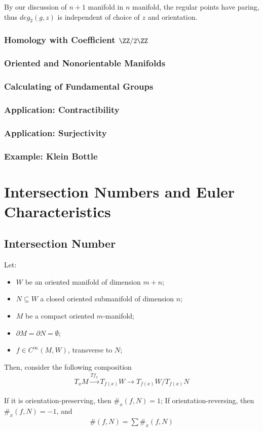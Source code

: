 \documentclass[Total.tex]{subfiles}
\begin{document}
				By our discussion of $n+1$ manifold in $n$ manifold, the regular points have paring, thus $deg_2(g,z)$ is independent of choice of $z$ and orientation. 
				
				\subsubsection{Homology with Coefficient $\ZZ/2\ZZ$}
				
				\subsubsection{Oriented and Nonorientable Manifolds}
				\subsubsection{Calculating of Fundamental Groups}
				\subsubsection{Application: Contractibility}
				\subsubsection{Application: Surjectivity}
				\subsubsection{Example: Klein Bottle}
		\section{Intersection Numbers and Euler Characteristics}
			\subsection{Intersection Number}
				\begin{Def}
					Let: 
					\begin{itemize}
						\item $W$ be an oriented manifold of dimension $m+n$;
						\item $N\subseteq W$ a closed oriented submanifold of dimension $n$;
						\item $M$ be a compact oriented $m$-manifold;
						\item $\partial M=\partial N=\emptyset$;
						\item $f\in C^\infty(M,W)$, transverse to $N$;
					\end{itemize}
					
					Then, consider the following composition
					\begin{gather*}
						T_xM\stackrel{Tf_x}{\rightarrow} T_{f(x)}W\rightarrow T_{f(x)}W/T_{f(x)}N
					\end{gather*}
					
					If it is orientation-preserving, then $\#_x(f,N)=1$; If orientation-reversing, then $\#_x(f,N)=-1$, and 
					\begin{gather*}
						\#(f,N)=\sum \#_x (f,N)
					\end{gather*}
				\end{Def}
				
\end{document}
